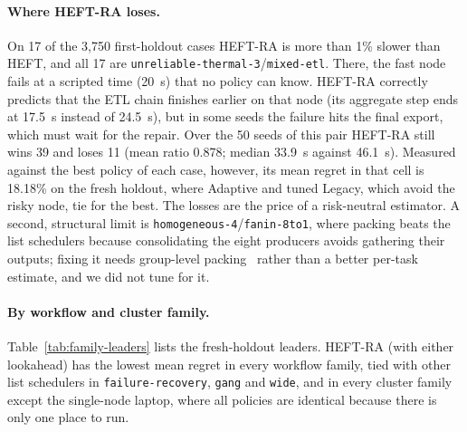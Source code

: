 \documentclass[12pt,a4paper]{report}
\begin{document}
\paragraph{Where HEFT-RA loses.} On 17 of the 3,750 first-holdout cases
HEFT-RA is more than 1\% slower than HEFT, and all 17 are
\texttt{unreliable-thermal-3}/\texttt{mixed-etl}. There, the fast node
fails at a scripted time (20~s) that no policy can know. HEFT-RA correctly
predicts that the ETL chain finishes earlier on that node (its aggregate
step ends at 17.5~s instead of 24.5~s), but in some seeds the failure hits
the final export, which must wait for the repair. Over the 50 seeds of
this pair HEFT-RA still wins 39 and loses 11 (mean ratio 0.878; median
33.9~s against 46.1~s). Measured against the best policy of each case,
however, its mean regret in that cell is 18.18\% on the fresh holdout,
where Adaptive and tuned Legacy, which avoid the risky node, tie for the
best. The losses are the price of a risk-neutral estimator. A second,
structural limit is \texttt{homogeneous-4}/\texttt{fanin-8to1}, where
packing beats the list schedulers because consolidating the eight
producers avoids gathering their outputs; fixing it needs group-level
packing~\cite{grandl2014tetris} rather than a better per-task estimate,
and we did not tune for it.

\paragraph{By workflow and cluster family.} Table~\ref{tab:family-leaders}
lists the fresh-holdout leaders. HEFT-RA (with either lookahead) has the
lowest mean regret in every workflow family, tied with other list
schedulers in \texttt{failure-recovery}, \texttt{gang} and \texttt{wide},
and in every cluster family except the single-node laptop, where all
policies are identical because there is only one place to run.
\end{document}
